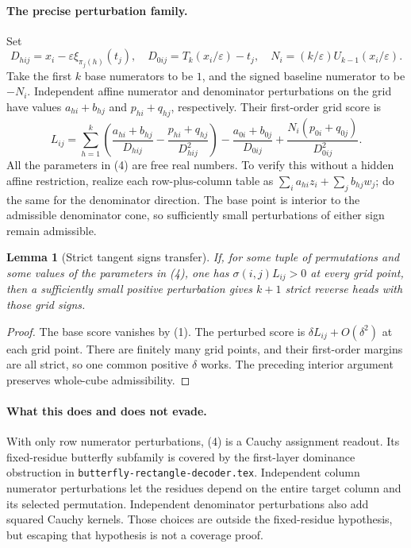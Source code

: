 \documentclass[11pt]{article}
\newtheorem{lemma}{Lemma}
\begin{document}
\paragraph{The precise perturbation family.}
Set
\[
 D_{hij}=x_i-\varepsilon\xi_{\pi_j(h)}(t_j),\quad
 D_{0ij}=T_k(x_i/\varepsilon)-t_j,\quad
 N_i=(k/\varepsilon)U_{k-1}(x_i/\varepsilon).
\]
Take the first $k$ base numerators to be $1$, and the signed baseline
numerator to be $-N_i$. Independent affine numerator and denominator
perturbations on the grid have values $a_{hi}+b_{hj}$ and
$p_{hi}+q_{hj}$, respectively. Their first-order grid score is
\[
 L_{ij}=\sum_{h=1}^k\left(
 \frac{a_{hi}+b_{hj}}{D_{hij}}
 -\frac{p_{hi}+q_{hj}}{D_{hij}^2}\right)
 -\frac{a_{0i}+b_{0j}}{D_{0ij}}
 +\frac{N_i(p_{0i}+q_{0j})}{D_{0ij}^2}.
 \tag{4}
\]
All the parameters in (4) are free real numbers. To verify this
without a hidden affine restriction, realize each row-plus-column
table as $\sum_i a_{hi}z_i+\sum_j b_{hj}w_j$; do the same for the
denominator direction. The base point is interior to the admissible
denominator cone, so sufficiently small perturbations of either sign
remain admissible.

\begin{lemma}[Strict tangent signs transfer]
If, for some tuple of permutations and some values of the parameters
in (4), one has $\sigma(i,j)L_{ij}>0$ at every grid point, then a
sufficiently small positive perturbation gives $k+1$ strict reverse
heads with those grid signs.
\end{lemma}
\begin{proof}
The base score vanishes by (1). The perturbed score is
$\delta L_{ij}+O(\delta^2)$ at each grid point. There are finitely
many grid points, and their first-order margins are all strict, so
one common positive $\delta$ works. The preceding interior argument
preserves whole-cube admissibility.
\end{proof}

\paragraph{What this does and does not evade.}
With only row numerator perturbations, (4) is a Cauchy assignment
readout. Its fixed-residue butterfly subfamily is covered by the
first-layer dominance obstruction in
\texttt{butterfly-rectangle-decoder.tex}. Independent column numerator
perturbations let the residues depend on the entire target column and
its selected permutation. Independent denominator perturbations also
add squared Cauchy kernels. Those choices are outside the fixed-residue
hypothesis, but escaping that hypothesis is not a coverage proof.
\end{document}
